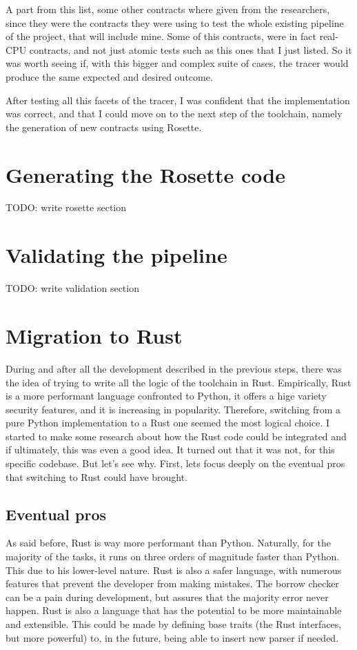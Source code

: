 A part from this list, some other contracts where given from the researchers, since
they were the contracts they were using to test the whole existing pipeline of the
project, that will include mine. Some of this contracts, were in fact real-CPU
contracts, and not just atomic tests such as this ones that I just listed. So it
was worth seeing if, with this bigger and complex suite of cases, the tracer
would produce the same expected and desired outcome.

After testing all this facets of the tracer, I was confident that the implementation
was correct, and that I could move on to the next step of the toolchain, namely the
generation of new contracts using Rosette.

\section{Generating the Rosette code}
\label{cha:Generating the Rosette code} TODO: write rosette section

\section{Validating the pipeline}
\label{cha:Validating the pipeline} TODO: write validation section

\section{Migration to Rust}
\label{cha:Migration to Rust} During and after all the development described in the
previous steps, there was the idea of trying to write all the logic of the
toolchain in Rust. Empirically, Rust is a more performant language confronted to
Python, it offers a hige variety security features, and it is increasing in
popularity. Therefore, switching from a pure Python implementation to a Rust one
seemed the most logical choice. I started to make some research about how the Rust
code could be integrated and if ultimately, this was even a good idea. It turned
out that it was not, for this specific codebase. But let's see why. First, lets focus
deeply on the eventual pros that switching to Rust could have brought.

\subsection[Eventual pros]{Eventual pros}
As said before, Rust is way more performant than Python. Naturally, for the
majority of the tasks, it runs on three orders of magnitude faster than Python.
This due to his lower-level nature. Rust is also a safer language, with numerous
features that prevent the developer from making mistakes. The borrow checker can
be a pain during development, but assures that the majority error never happen. Rust
is also a language that has the potential to be more maintainable and extensible.
This could be made by defining base traits (the Rust interfaces, but more
powerful) to, in the future, being able to insert new parser if needed.


